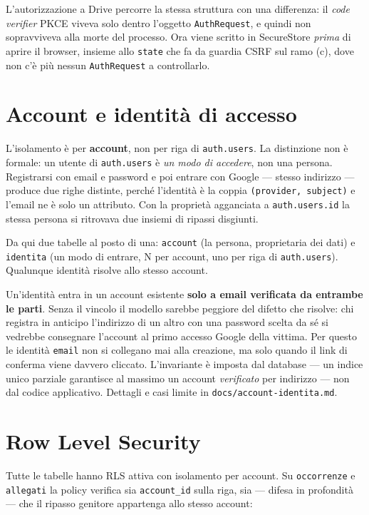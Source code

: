 \documentclass[11pt,a4paper]{report}
\begin{document}
L'autorizzazione a Drive percorre la stessa struttura con una differenza: il
\emph{code verifier} PKCE viveva solo dentro l'oggetto \texttt{AuthRequest}, e
quindi non sopravviveva alla morte del processo. Ora viene scritto in
SecureStore \emph{prima} di aprire il browser, insieme allo \texttt{state} che
fa da guardia CSRF sul ramo (c), dove non c'\`e pi\`u nessun
\texttt{AuthRequest} a controllarlo.

\section{Account e identit\`a di accesso}

L'isolamento \`e per \textbf{account}, non per riga di \texttt{auth.users}.
La distinzione non \`e formale: un utente di \texttt{auth.users} \`e
\emph{un modo di accedere}, non una persona. Registrarsi con email e password
e poi entrare con Google — stesso indirizzo — produce due righe distinte,
perch\'e l'identit\`a \`e la coppia \texttt{(provider, subject)} e l'email ne
\`e solo un attributo. Con la propriet\`a agganciata a \texttt{auth.users.id}
la stessa persona si ritrovava due insiemi di ripassi disgiunti.

Da qui due tabelle al posto di una: \texttt{account} (la persona, proprietaria
dei dati) e \texttt{identita} (un modo di entrare, N per account, uno per riga
di \texttt{auth.users}). Qualunque identit\`a risolve allo stesso account.

Un'identit\`a entra in un account esistente \textbf{solo a email verificata da
entrambe le parti}. Senza il vincolo il modello sarebbe peggiore del difetto
che risolve: chi registra in anticipo l'indirizzo di un altro con una password
scelta da s\'e si vedrebbe consegnare l'account al primo accesso Google della
vittima. Per questo le identit\`a \texttt{email} non si collegano mai alla
creazione, ma solo quando il link di conferma viene davvero cliccato.
L'invariante \`e imposta dal database — un indice unico parziale garantisce al
massimo un account \emph{verificato} per indirizzo — non dal codice
applicativo. Dettagli e casi limite in \texttt{docs/account-identita.md}.

\section{Row Level Security}

Tutte le tabelle hanno RLS attiva con isolamento per account. Su
\texttt{occorrenze} e \texttt{allegati} la policy verifica sia
\texttt{account\_id} sulla riga, sia — difesa in profondit\`a — che il ripasso
genitore appartenga allo stesso account:
\end{document}
